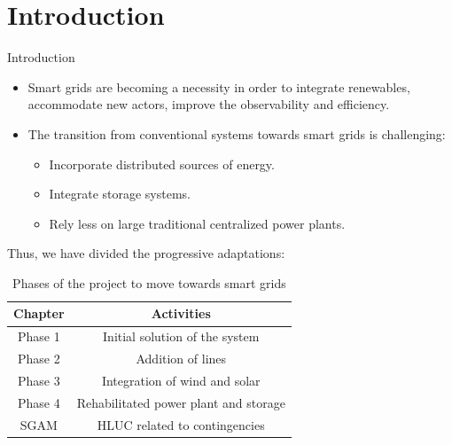 \section{Introduction}
\begin{frame}{Introduction}
  \begin{itemize}
  \item Smart grids are becoming a necessity in order to integrate renewables, accommodate new actors, improve the observability and efficiency.
    \item The transition from conventional systems towards smart grids is challenging:
      \begin{itemize}
        \item Incorporate distributed sources of energy.
        \item Integrate storage systems.
        \item Rely less on large traditional centralized power plants.
      \end{itemize}
  \end{itemize}
  Thus, we have divided the progressive adaptations:
  \begin{table}\footnotesize
    \begin{tabular}{cc}
      \hline
      \textbf{Chapter} & \textbf{Activities} \\
      \hline
      \hline
      Phase 1 & Initial solution of the system \\
      Phase 2 & Addition of lines \\
      Phase 3 & Integration of wind and solar \\
      Phase 4 & Rehabilitated power plant and storage \\
      SGAM & HLUC related to contingencies \\
      \hline
    \end{tabular}
    \caption{Phases of the project to move towards smart grids}
  \end{table}
\end{frame}





